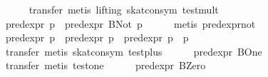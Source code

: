 \begin{isabellebody}
\ \ \ \ \isamarkupfalse%
\ {}transfer{}\ metis\ {}lifting{}\ skat{}con{}sym\ test{}mult{}\isanewline
\ \ \isamarkupfalse%
\ {}{}{}pred{}expr\ p{}{}\ {}\ pred{}expr\ {}BNot\ p{}{}{}\isanewline
\ \ \ \ \isamarkupfalse%
\ {}metis\ pred{}expr{}not{}\isanewline
\ \ \isamarkupfalse%
\ {}pred{}expr\ p{}\ {}\ pred{}expr\ p{}\ {}\ pred{}expr\ {}p{}\ {}{}{}\ p{}{}{}\isanewline
\ \ \ \ \isamarkupfalse%
\ {}transfer{}\ metis\ skat{}con{}sym\ test{}plus{}\isanewline
\ \ \isamarkupfalse%
\ {}{}\ {}\ pred{}expr\ BOne{}\isanewline
\ \ \ \ \isamarkupfalse%
\ {}transfer{}\ metis\ test{}one{}\isanewline
\ \ \isamarkupfalse%
\ {}{}\ {}\ pred{}expr\ BZero{}\isanewline

\end{isabellebody}
